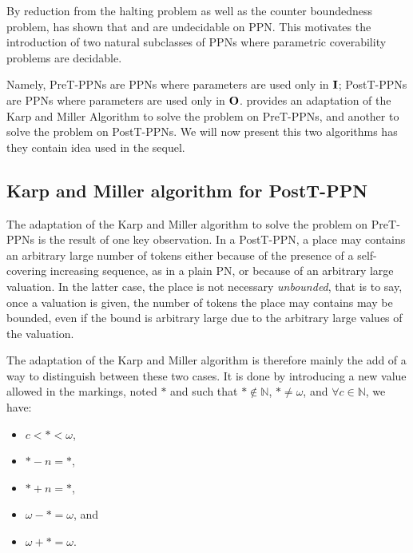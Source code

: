 By reduction from the halting problem as well as the counter boundedness problem, \cite{David17} has shown that \Ucov and \Ecov are undecidable on \ac{PPN}.
This motivates the introduction of two natural subclasses of \acp{PPN} where parametric coverability problems are decidable.

Namely,
PreT-PPNs are \acp{PPN} where parameters are used only in $\mathbf{I}$;
PostT-PPNs are \acp{PPN} where parameters are used only in $\mathbf{O}$.
\cite{David17} provides an adaptation of the Karp and Miller Algorithm to solve the \Ucov problem on PreT-\acp{PPN}, and another to solve the \Ecov problem on PostT-\acp{PPN}.
We will now present this two algorithms has they contain idea used in the sequel.

\subsection{Karp and Miller algorithm for PostT-\ac{PPN}}

The adaptation of the Karp and Miller algorithm to solve the \Ecov problem on PreT-\acp{PPN} is the result of one key observation.
In a PostT-\ac{PPN}, a place may contains an arbitrary large number of tokens either because of the presence of a self-covering increasing sequence, as in a plain \ac{PN}, or because of an arbitrary large valuation.
In the latter case, the place is not necessary \emph{unbounded}, that is to say, once a valuation is given, the number of tokens the place may contains may be bounded, even if the bound is arbitrary large due to the arbitrary large values of the valuation.

The adaptation of the Karp and Miller algorithm is therefore mainly the add of a way to distinguish between these two cases.
It is done by introducing a new value allowed in the markings, noted $*$ and such that $* \notin \mathbb{N}$, $* \neq \omega$, and $\forall c \in \mathbb{N}$, we have:
\begin{itemize}
  \item $c < * < \omega$,
  \item $* - n = *$,
  \item $* + n = *$,
  \item $\omega - * = \omega$, and
  \item $\omega + * = \omega$.
\end{itemize}

